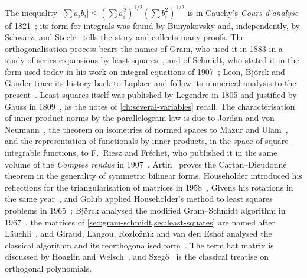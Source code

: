 The inequality $|\sum a_ib_i|\le(\sum a_i^2)^{1/2}(\sum b_i^2)^{1/2}$ is in Cauchy's \emph{Cours d'analyse} of 1821~\cite{cauchy1821}; its form for integrals was found by Bunyakovsky and, independently, by Schwarz, and Steele~\cite{steele2004} tells the story and collects many proofs. The orthogonalisation process bears the names of Gram, who used it in 1883 in a study of series expansions by least squares~\cite{gram1883}, and of Schmidt, who stated it in the form used today in his work on integral equations of 1907~\cite{schmidt1907}; Leon, Bj\"orck and Gander trace its history back to Laplace and follow its numerical analysis to the present~\cite{leon2013}. Least squares itself was published by Legendre in 1805 and justified by Gauss in 1809~\cite{legendre1805,gauss1809,stigler1981}, as the notes of \cref{ch:several-variables} recall. The characterisation of inner product norms by the parallelogram law is due to Jordan and von Neumann~\cite{jordanvonneumann1935}, the theorem on isometries of normed spaces to Mazur and Ulam~\cite{mazur1932}, and the representation of functionals by inner products, in the space of square-integrable functions, to F.~Riesz and Fr\'echet, who published it in the same volume of the \emph{Comptes rendus} in 1907~\cite{riesz1907,frechet1907}. Artin~\cite{artin1957geometric} proves the Cartan--Dieudonn\'e theorem in the generality of symmetric bilinear forms. Householder introduced his reflections for the triangularisation of matrices in 1958~\cite{householder1958}, Givens his rotations in the same year~\cite{givens1958}, and Golub applied Householder's method to least squares problems in 1965~\cite{golub1965}; Bj\"orck analysed the modified Gram--Schmidt algorithm in 1967~\cite{bjorck1967}, the matrices of \cref{sec:gram-schmidt,sec:least-squares} are named after L\"auchli~\cite{lauchli1961}, and Giraud, Langou, Rozlo\v{z}n\'{\i}k and van den Eshof analysed the classical algorithm and its reorthogonalised form~\cite{giraud2005numer,giraud2005camwa}. The term hat matrix is discussed by Hoaglin and Welsch~\cite{hoaglin1978}, and Szeg\H{o}~\cite{szego1975} is the classical treatise on orthogonal polynomials.

